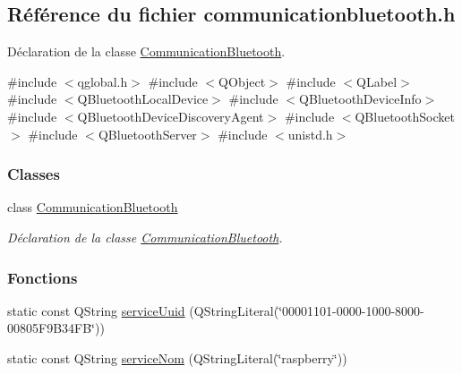 \hypertarget{ecran-_t_t_p_a_2communicationbluetooth_8h}{}\subsection{Référence du fichier communicationbluetooth.\+h}
\label{ecran-_t_t_p_a_2communicationbluetooth_8h}


Déclaration de la classe \hyperlink{class_communication_bluetooth}{Communication\+Bluetooth}.  


{\ttfamily \#include $<$qglobal.\+h$>$}\newline
{\ttfamily \#include $<$Q\+Object$>$}\newline
{\ttfamily \#include $<$Q\+Label$>$}\newline
{\ttfamily \#include $<$Q\+Bluetooth\+Local\+Device$>$}\newline
{\ttfamily \#include $<$Q\+Bluetooth\+Device\+Info$>$}\newline
{\ttfamily \#include $<$Q\+Bluetooth\+Device\+Discovery\+Agent$>$}\newline
{\ttfamily \#include $<$Q\+Bluetooth\+Socket$>$}\newline
{\ttfamily \#include $<$Q\+Bluetooth\+Server$>$}\newline
{\ttfamily \#include $<$unistd.\+h$>$}\newline
\subsubsection*{Classes}
\begin{DoxyCompactItemize}
\item 
class \hyperlink{class_communication_bluetooth}{Communication\+Bluetooth}
\begin{DoxyCompactList}\small\item\em Déclaration de la classe \hyperlink{class_communication_bluetooth}{Communication\+Bluetooth}. \end{DoxyCompactList}\end{DoxyCompactItemize}
\subsubsection*{Fonctions}
\begin{DoxyCompactItemize}
\item 
static const Q\+String \hyperlink{ecran-_t_t_p_a_2communicationbluetooth_8h_a89b03bf9986896053fdab3d4f80d7c04}{service\+Uuid} (Q\+String\+Literal(\char`\"{}00001101-\/0000-\/1000-\/8000-\/00805\+F9\+B34\+F\+B\char`\"{}))
\item 
static const Q\+String \hyperlink{ecran-_t_t_p_a_2communicationbluetooth_8h_a0b0819170cad3a534c62951bcbe70436}{service\+Nom} (Q\+String\+Literal(\char`\"{}raspberry\char`\"{}))
\end{DoxyCompactItemize}


